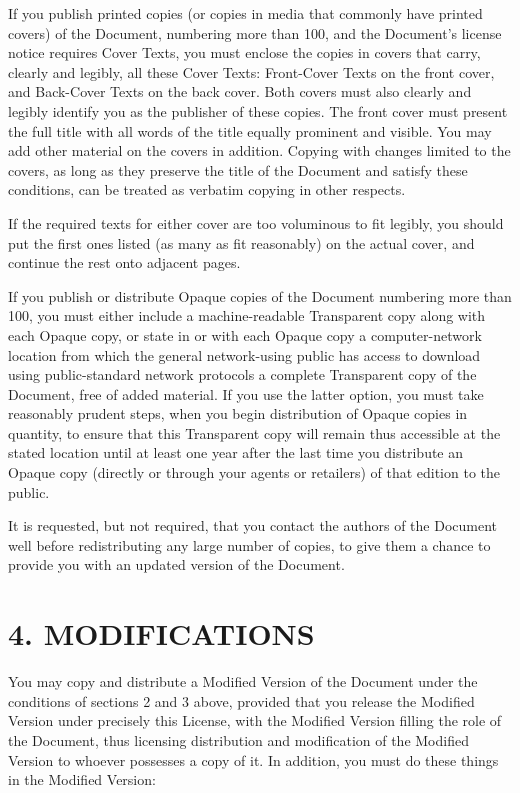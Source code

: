 \documentclass[captions=tableheading]{scrbook}
\begin{document}
If you publish printed copies (or copies in media that commonly have printed covers) of the Document, numbering more than 100, and the Document's license notice requires Cover Texts, you must enclose the copies in covers that carry, clearly and legibly, all these Cover Texts: Front-Cover Texts on the front cover, and Back-Cover Texts on the back cover. Both covers must also clearly and legibly identify you as the publisher of these copies. The front cover must present the full title with all words of the title equally prominent and visible. You may add other material on the covers in addition. Copying with changes limited to the covers, as long as they preserve the title of the Document and satisfy these conditions, can be treated as verbatim copying in other respects.

If the required texts for either cover are too voluminous to fit legibly, you should put the first ones listed (as many as fit reasonably) on the actual cover, and continue the rest onto adjacent pages.

If you publish or distribute Opaque copies of the Document numbering more than 100, you must either include a machine-readable Transparent copy along with each Opaque copy, or state in or with each Opaque copy a computer-network location from which the general network-using public has access to download using public-standard network protocols a complete Transparent copy of the Document, free of added material. If you use the latter option, you must take reasonably prudent steps, when you begin distribution of Opaque copies in quantity, to ensure that this Transparent copy will remain thus accessible at the stated location until at least one year after the last time you distribute an Opaque copy (directly or through your agents or retailers) of that edition to the public.

It is requested, but not required, that you contact the authors of the Document well before redistributing any large number of copies, to give them a chance to provide you with an updated version of the Document.
\section{4. MODIFICATIONS}
\label{sec-3-5}


You may copy and distribute a Modified Version of the Document under the conditions of sections 2 and 3 above, provided that you release the Modified Version under precisely this License, with the Modified Version filling the role of the Document, thus licensing distribution and modification of the Modified Version to whoever possesses a copy of it. In addition, you must do these things in the Modified Version:
\end{document}
